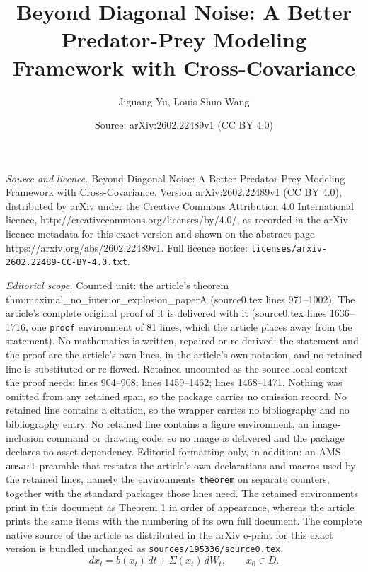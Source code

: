 \documentclass[10pt,a4paper]{amsart}
\title{Beyond Diagonal Noise: A Better Predator-Prey Modeling Framework with Cross-Covariance}
\author{Jiguang Yu, Louis Shuo Wang}
\date{Source: arXiv:2602.22489v1 (CC BY 4.0)}
\begin{document}
\maketitle

\noindent\emph{Source and licence.} Beyond Diagonal Noise: A Better Predator-Prey Modeling Framework with Cross-Covariance. Version arXiv:2602.22489v1 (CC BY 4.0), distributed by arXiv under the Creative Commons Attribution 4.0 International licence, http://creativecommons.org/licenses/by/4.0/, as recorded in the arXiv licence metadata for this exact version and shown on the abstract page https://arxiv.org/abs/2602.22489v1. Full licence notice: \texttt{licenses/arxiv-2602.22489-CC-BY-4.0.txt}.\par\smallskip

\noindent\textit{Editorial scope.} Counted unit: the article's theorem thm:maximal\_no\_interior\_explosion\_paperA (source0.tex lines 971--1002). The article's complete original proof of it is delivered with it (source0.tex lines 1636--1716, one \texttt{proof} environment of 81 lines, which the article places away from the statement). No mathematics is written, repaired or re-derived: the statement and the proof are the article's own lines, in the article's own notation, and no retained line is substituted or re-flowed.  Retained uncounted as the source-local context the proof needs: lines 904--908; lines 1459--1462; lines 1468--1471.  Nothing was omitted from any retained span, so the package carries no omission record.  No retained line contains a citation, so the wrapper carries no bibliography and no bibliography entry.  No retained line contains a figure environment, an image-inclusion command or drawing code, so no image is delivered and the package declares no asset dependency.  Editorial formatting only, in addition: an AMS \texttt{amsart} preamble that restates the article's own declarations and macros used by the retained lines, namely the environments \texttt{theorem} on separate counters, together with the standard packages those lines need.  The retained environments print in this document as Theorem 1 in order of appearance, whereas the article prints the same items with the numbering of its own full document.  The complete native source of the article as distributed in the arXiv e-print for this exact version is bundled unchanged as \texttt{sources/195336/source0.tex}.
\begin{equation}
\label{eq:open_domain_SDE_paperA}
dx_t=b(x_t)\,dt+\Sigma(x_t)\,dW_t,
\qquad x_0\in D.
\end{equation}
\end{document}
